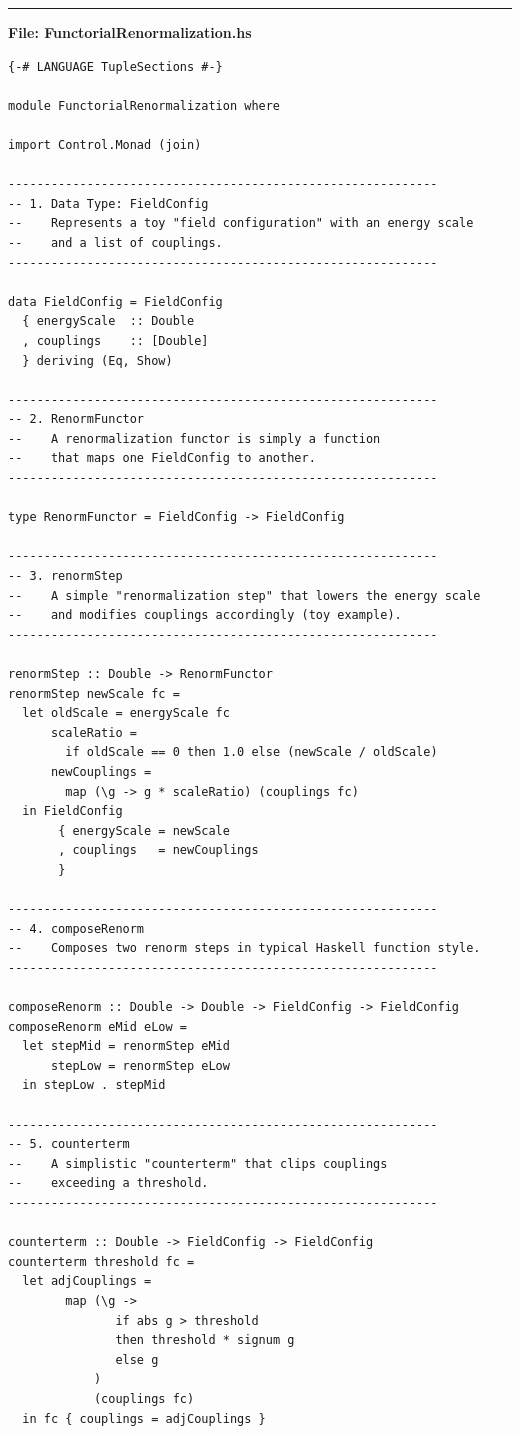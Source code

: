 \documentclass[12pt]{article}
\begin{document}
\noindent\rule{\textwidth}{0.4pt}
\textbf{File: FunctorialRenormalization.hs}
\begin{verbatim}
{-# LANGUAGE TupleSections #-}

module FunctorialRenormalization where

import Control.Monad (join)

------------------------------------------------------------
-- 1. Data Type: FieldConfig
--    Represents a toy "field configuration" with an energy scale
--    and a list of couplings.
------------------------------------------------------------

data FieldConfig = FieldConfig
  { energyScale  :: Double
  , couplings    :: [Double]
  } deriving (Eq, Show)

------------------------------------------------------------
-- 2. RenormFunctor
--    A renormalization functor is simply a function
--    that maps one FieldConfig to another.
------------------------------------------------------------

type RenormFunctor = FieldConfig -> FieldConfig

------------------------------------------------------------
-- 3. renormStep
--    A simple "renormalization step" that lowers the energy scale
--    and modifies couplings accordingly (toy example).
------------------------------------------------------------

renormStep :: Double -> RenormFunctor
renormStep newScale fc =
  let oldScale = energyScale fc
      scaleRatio =
        if oldScale == 0 then 1.0 else (newScale / oldScale)
      newCouplings =
        map (\g -> g * scaleRatio) (couplings fc)
  in FieldConfig
       { energyScale = newScale
       , couplings   = newCouplings
       }

------------------------------------------------------------
-- 4. composeRenorm
--    Composes two renorm steps in typical Haskell function style.
------------------------------------------------------------

composeRenorm :: Double -> Double -> FieldConfig -> FieldConfig
composeRenorm eMid eLow =
  let stepMid = renormStep eMid
      stepLow = renormStep eLow
  in stepLow . stepMid

------------------------------------------------------------
-- 5. counterterm
--    A simplistic "counterterm" that clips couplings
--    exceeding a threshold.
------------------------------------------------------------

counterterm :: Double -> FieldConfig -> FieldConfig
counterterm threshold fc =
  let adjCouplings =
        map (\g ->
               if abs g > threshold
               then threshold * signum g
               else g
            )
            (couplings fc)
  in fc { couplings = adjCouplings }


\end{verbatim}
\end{document}
